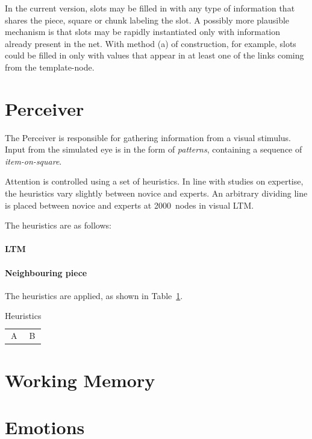 \documentclass{article}
\begin{document}
In the current version, slots may be filled in with any type of information
that shares the piece, square or chunk labeling the slot. A possibly more
plausible mechanism is that slots may be rapidly instantiated only with
information already present in the net.  With method (a) of construction, for
example, slots could be filled in only with values that appear in at least one
of the links coming from the template-node.


\section{Perceiver}

The Perceiver is responsible for gathering information from a visual stimulus.
Input from the simulated eye is in the form of {\em patterns}, containing 
a sequence of {\em item-on-square}.

Attention is controlled using a set of heuristics.  In line with studies 
on expertise, the heuristics vary slightly between novice and experts.  An 
arbitrary dividing line is placed between novice and experts at 2000~nodes in 
visual LTM.

The heuristics are as follows:

\paragraph {LTM}

\paragraph {Neighbouring piece}

The heuristics are applied, as shown in Table~\ref{heuristics}.

\begin{table}
\begin{tabular}{cc}
A & B\\
\end{tabular}
\caption{Heuristics}
\label{heuristics}
\end{table}


\section{Working Memory}

\section{Emotions}
\end{document}
